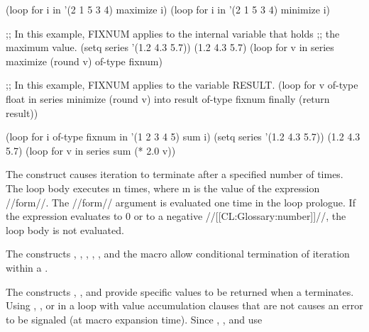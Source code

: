 \endsubsubsection%


\code
 (loop for i in '(2 1 5 3 4)
       maximize i)
 (loop for i in '(2 1 5 3 4)
       minimize i)
 
;; In this example, FIXNUM applies to the internal variable that holds
;; the maximum value.
 (setq series '(1.2 4.3 5.7))
\EV (1.2 4.3 5.7)
 (loop for v in series 
       maximize (round v) of-type fixnum)
 
;; In this example, FIXNUM applies to the variable RESULT.
 (loop for v of-type float in series
       minimize (round v) into result of-type fixnum
       finally (return result))
\endcode

\endsubsubsection%


\code
 (loop for i of-type fixnum in '(1 2 3 4 5)
       sum i)
 (setq series '(1.2 4.3 5.7))
\EV (1.2 4.3 5.7)
 (loop for v in series 
       sum (* 2.0 v))
\endcode

\endsubsubsection%

\endsubsection%


The  construct causes iteration to terminate after a
specified number of times.
 The loop body executes \i{n} times, where \i{n} is the value 
of the expression //form//.  The //form// argument is evaluated one time
in the loop prologue.  If the expression evaluates to 0 or 
to a negative //[[CL:Glossary:number]]//, the loop body is not evaluated.

The constructs ,
,
,
,
,
and the macro 
allow conditional termination of iteration within
a .

The constructs , , and  provide
specific values to be returned when a  terminates.  
Using , , or  in a loop with 
value accumulation clauses that are not  causes 
an error  to be signaled (at macro expansion time).
Since , , and 
use 


